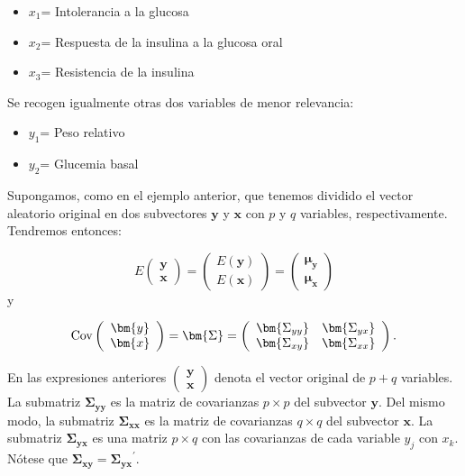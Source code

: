 \documentclass[
  a4paper,
  oneside]{scrbook}
\theoremstyle{definition}
\theoremstyle{definition}
\theoremstyle{definition}
\theoremstyle{definition}
\theoremstyle{remark}
\begin{document}
\begin{itemize}
\item
  \(x_1\)= Intolerancia a la glucosa
\item
  \(x_2\)= Respuesta de la insulina a la glucosa oral
\item
  \(x_3\)= Resistencia de la insulina
\end{itemize}

Se recogen igualmente otras dos variables de menor relevancia:

\begin{itemize}
\item
  \(y_1\)= Peso relativo
\item
  \(y_2\)= Glucemia basal
\end{itemize}

Supongamos, como en el ejemplo anterior, que tenemos dividido el vector
aleatorio original en dos subvectores \(\bm{y}\) y \(\bm{x}\) con \(p\) y \(q\)
variables, respectivamente. Tendremos entonces:

\[E\left(\begin{array}{c}\bm{y}\\ \bm{x}\end{array}\right)=\left(\begin{array}{c}E(\bm{y})\\ E(\bm{x})\end{array}\right)=\left(\begin{array}{c}\bm{\mu_y}\\ \bm{\mu_x}\end{array}\right)\]
y

\[\textnormal{Cov}\left(\begin{array}{c}\bm{y}\\ \bm{x}\end{array}\right)=\bm{\Sigma}=\left(\begin{array}{cc}\bm{\Sigma_{yy}}&\bm{\Sigma_{yx}}\\ \bm{\Sigma_{xy}}&\bm{\Sigma_{xx}}\end{array}\right).\]

En las expresiones anteriores
\(\left(\begin{array}{c}\bm{y}\\ \bm{x}\end{array}\right)\) denota el
vector original de \(p+q\) variables. La submatriz \(\bm{\Sigma_{yy}}\) es
la matriz de covarianzas \(p\times p\) del subvector \(\bm{y}\). Del mismo
modo, la submatriz \(\bm{\Sigma_{xx}}\) es la matriz de covarianzas
\(q\times q\) del subvector \(\bm{x}\). La submatriz \(\bm{\Sigma_{yx}}\) es
una matriz \(p\times q\) con las covarianzas de cada variable \(y_j\) con
\(x_k\). Nótese que \(\bm{\Sigma_{xy}}=\bm{\Sigma_{yx}}^\prime\).
\end{document}
